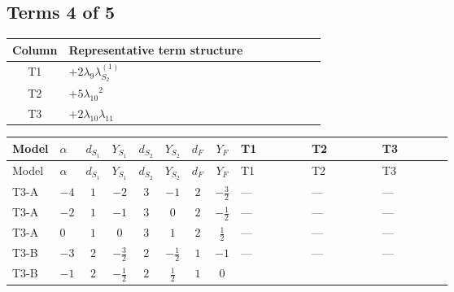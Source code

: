 \documentclass[8pt]{article}
\begin{document}
\begin{landscape}
\subsection*{Terms 4 of 5}
\begin{center}
\begin{tabular}{@{}c >{\raggedright\arraybackslash}p{0.82\linewidth}@{}}
\toprule
Column & Representative term structure \\
\midrule
T1 & \(\displaystyle +2 {\lambda_{9}} {\lambda_{S_2}^{(1)}}\) \\
\midrule
T2 & \(\displaystyle +5 {\lambda_{10}}^2\) \\
\midrule
T3 & \(\displaystyle +2 {\lambda_{10}} {\lambda_{11}}\) \\
\midrule
\bottomrule
\end{tabular}
\end{center}
\smallskip
\tiny
\begin{longtable}{@{}llcccccc >{\raggedright\arraybackslash}p{0.21\linewidth} >{\raggedright\arraybackslash}p{0.21\linewidth} >{\raggedright\arraybackslash}p{0.21\linewidth}@{}}
\toprule
Model & $\alpha$ & $d_{S_1}$ & $Y_{S_1}$ & $d_{S_2}$ & $Y_{S_2}$ & $d_F$ & $Y_F$ & T1 & T2 & T3 \\
\midrule
\endfirsthead
\toprule
Model & $\alpha$ & $d_{S_1}$ & $Y_{S_1}$ & $d_{S_2}$ & $Y_{S_2}$ & $d_F$ & $Y_F$ & T1 & T2 & T3 \\
\midrule
\endhead
T3-A & $-4$ & $1$ & $-2$ & $3$ & $-1$ & $2$ & $-\frac{3}{2}$ & --- & --- & --- \\
\midrule
T3-A & $-2$ & $1$ & $-1$ & $3$ & $0$ & $2$ & $-\frac{1}{2}$ & --- & --- & --- \\
\midrule
T3-A & $0$ & $1$ & $0$ & $3$ & $1$ & $2$ & $\frac{1}{2}$ & --- & --- & --- \\
\midrule
T3-B & $-3$ & $2$ & $-\frac{3}{2}$ & $2$ & $-\frac{1}{2}$ & $1$ & $-1$ & --- & --- & --- \\
\midrule
T3-B & $-1$ & $2$ & $-\frac{1}{2}$ & $2$ & $\frac{1}{2}$ & $1$ & $0$ & \scriptsize\adjustbox{max width=\linewidth}{$\begin{gathered} +2 {\lambda_{9}} {\lambda_{S_2}^{(1)}}\end{gathered}$} & \scriptsize\adjustbox{max width=\linewidth}{$\begin{gathered} +5 {\lambda_{10}}^2 \\ +5 {\lambda_{11}}^2\end{gathered}$} & \scriptsize\adjustbox{max width=\linewidth}{$\begin{gathered} +2 {\lambda_{10}} {\lambda_{11}}\end{gathered}$} \\

\end{longtable}
\end{landscape}
\end{document}
